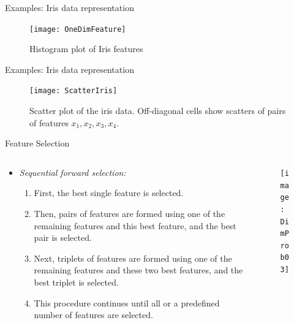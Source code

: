 \begin{frame}{Examples: Iris data representation}
\begin{figure}
\texttt{[image: OneDimFeature]}
\caption{Histogram plot of Iris features}
\end{figure}
\end{frame}


\begin{frame}{Examples: Iris data representation}
\begin{figure}
\texttt{[image: ScatterIris]}
\caption{Scatter plot of the iris data. Off-diagonal cells show scatters of pairs of features $x_1, x_2, x_3, x_4$.}
\end{figure}
\end{frame}

\begin{frame}{Feature Selection}
\begin{columns}
\begin{column}{7cm}
\begin{itemize}
\item \textit{\color{mycolor2}Sequential forward selection:}
\begin{enumerate}
\item First, the best single feature is selected.
\item Then, pairs of features are formed using one of the
remaining features and this best feature, and the best pair is
selected.
\item Next, triplets of features are formed using one of the
remaining features and these two best features, and the best
triplet is selected.
\item This procedure continues until all or a predefined number of features are selected.
\end{enumerate}
\end{itemize}
\end{column}
\begin{column}{7cm}
\begin{figure}
\texttt{[image: DimProb03]}
\end{figure}
\end{column}
\end{columns}
\end{frame}

